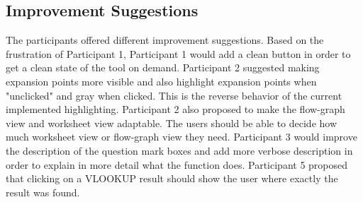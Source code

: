 \subsection{Improvement Suggestions}
The participants offered different improvement suggestions. Based on the frustration of Participant 1, Participant 1 would add a clean button in order to get a clean state of the tool on demand. Participant 2 suggested making expansion points more visible and also highlight expansion points when "unclicked" and gray when clicked. This is the reverse behavior of the current implemented highlighting. Participant 2 also proposed to make the flow-graph view and worksheet view adaptable. The users should be able to decide how much worksheet view or flow-graph view they need. Participant 3 would improve the description of the question mark boxes and add more verbose description in order to explain in more detail what the function does. Participant 5 proposed that clicking on a VLOOKUP result should show the user where exactly the result was found.

